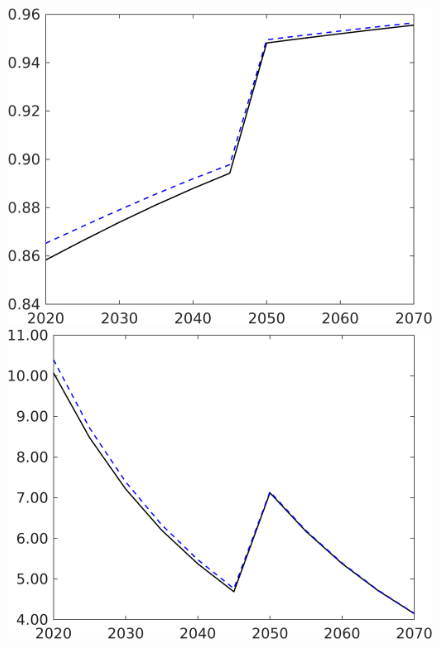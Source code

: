 \begin{figure}[h!!]
\begin{minipage}[]{0.32\textwidth}
\end{minipage}
\begin{minipage}[]{0.32\textwidth}
	\includegraphics[width=1\textwidth]{../../codding_model/own_basedOnFried/optimalPol_190722_tidiedUp/figures/all_10Aout22/comp_benchregime3_notaul2_OPT_T_NoTaus_tauf_spillover0_noskill0_sep1_xgrowth0_PV1_etaa0.79_lgd0.png}
\end{minipage}
\begin{minipage}[]{0.32\textwidth}
	\includegraphics[width=1\textwidth]{../../codding_model/own_basedOnFried/optimalPol_190722_tidiedUp/figures/all_10Aout22/S_PercentageLfDynNT_noeff_Target_regime3_spillover0_noskill0_sep1_xgrowth0_etaa0.79_lgd0.png}

\end{minipage}
\end{figure}
